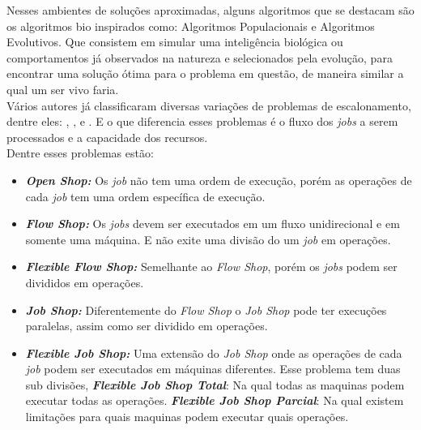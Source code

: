         Nesses ambientes de soluções aproximadas, alguns algoritmos que se destacam são os algoritmos bio inspirados como: Algoritmos Populacionais e Algoritmos Evolutivos. 
        Que consistem em simular uma inteligência biológica ou comportamentos já observados na natureza e selecionados pela evolução, para encontrar uma solução ótima para o problema em questão, de maneira similar a qual um ser vivo faria.\\


        Vários autores já classificaram diversas variações de problemas de escalonamento, dentre eles: \cite{graham1979}, \cite{Lenstra1979}, e \cite{maccarthy1993}. E o que diferencia esses problemas é o fluxo dos \textit{jobs} a serem processados e a capacidade dos recursos.\\
        
        \noindent Dentre esses problemas estão:
        \begin{itemize}
            \item \textbf{\textit{Open Shop:}} Os \textit{job} não tem uma ordem de execução, porém as operações de cada \textit{job} tem uma ordem específica de execução.
            
            \item \textbf{\textit{Flow Shop:}} Os \textit{jobs} devem ser executados em um fluxo unidirecional e em somente uma máquina. E não exite uma divisão do um \textit{job} em operações.
            
            \item \textbf{\textit{Flexible Flow Shop:}} Semelhante ao \textit{Flow Shop}, porém os \textit{jobs} podem ser divididos em operações.
            
            \item \textbf{\textit{Job Shop:}} Diferentemente do \textit{Flow Shop} o \textit{Job Shop} pode ter execuções paralelas, assim como ser dividido em operações.
            
            \item \textbf{\textit{Flexible Job Shop:}} Uma extensão do \textit{Job Shop} onde as operações de cada \textit{job} podem ser executados em máquinas diferentes. Esse problema tem duas sub divisões, 
            \subitem \textbf{\textit{Flexible Job Shop Total}}: Na qual todas as maquinas podem executar todas as operações. 
            \subitem \textbf{\textit{Flexible Job Shop Parcial}}: Na qual existem limitações para quais maquinas podem executar quais operações.
        \end{itemize}

